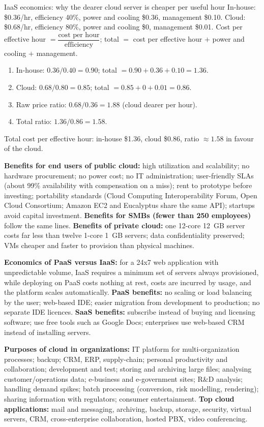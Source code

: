 \begin{solved}{IaaS economics: why the dearer cloud server is cheaper per useful hour}
\Given In-house: \$0.36/hr, efficiency 40\%, power and cooling \$0.36, management \$0.10.
Cloud: \$0.68/hr, efficiency 80\%, power and cooling \$0, management \$0.01.
\Formula Cost per effective hour $= \dfrac{\text{cost per hour}}{\text{efficiency}}$;\quad
total $=$ cost per effective hour $+$ power and cooling $+$ management.
\Steps
\begin{enumerate}[leftmargin=*]
  \item In-house: $0.36/0.40 = 0.90$; total $= 0.90 + 0.36 + 0.10 = 1.36$.
  \item Cloud: $0.68/0.80 = 0.85$; total $= 0.85 + 0 + 0.01 = 0.86$.
  \item Raw price ratio: $0.68/0.36 = 1.88$ (cloud dearer per hour).
  \item Total ratio: $1.36/0.86 = 1.58$.
\end{enumerate}
\Answer Total cost per effective hour: in-house \$1.36, cloud \$0.86, ratio $\approx 1.58$ in favour of the cloud.
\end{solved}

\textbf{Benefits for end users of public cloud:} high utilization and scalability; no hardware
procurement; no power cost; no IT administration; user-friendly SLAs (about 99\% availability with
compensation on a miss); rent to prototype before investing; portability standards (Cloud Computing
Interoperability Forum, Open Cloud Consortium; Amazon EC2 and Eucalyptus share the same API);
startups avoid capital investment. \textbf{Benefits for SMBs (fewer than 250 employees)} follow the same
lines. \textbf{Benefits of private cloud:} one 12-core 12~GB server costs far less than twelve 1-core 1~GB
servers; data confidentiality preserved; VMs cheaper and faster to provision than physical machines.

\textbf{Economics of PaaS versus IaaS:} for a 24x7 web application with unpredictable volume, IaaS requires
a minimum set of servers always provisioned, while deploying on PaaS costs nothing at rest, costs are
incurred by usage, and the platform scales automatically. \textbf{PaaS benefits:} no scaling or load
balancing by the user; web-based IDE; easier migration from development to production; no separate IDE
licences. \textbf{SaaS benefits:} subscribe instead of buying and licensing software; use free tools such as
Google Docs; enterprises use web-based CRM instead of installing servers.

\textbf{Purposes of cloud in organizations:} IT platform for multi-organization processes; backup; CRM,
ERP, supply-chain; personal productivity and collaboration; development and test; storing and archiving
large files; analysing customer/operations data; e-business and e-government sites; R\&D analysis; handling
demand spikes; batch processing (conversion, risk modelling, rendering); sharing information with
regulators; consumer entertainment. \textbf{Top cloud applications:} mail and messaging, archiving, backup,
storage, security, virtual servers, CRM, cross-enterprise collaboration, hosted PBX, video conferencing.

